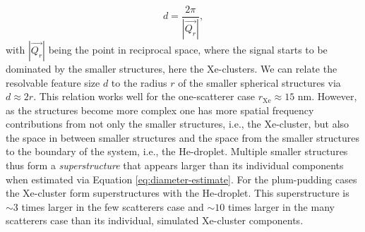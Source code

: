\begin{equation}
d = \frac{2\pi}{\left|\vec{Q_{r}}\right|},
\label{eq:diameter-estimate}
\end{equation}
with $\left|\vec{Q_{r}}\right|$ being the point in reciprocal space, where the signal starts to be dominated by the smaller structures, here the Xe-clusters. We can relate the resolvable feature size $d$ to the radius $r$ of the smaller spherical structures via $d\approx 2 r$. This relation works well for the one-scatterer case $r_{\text{Xe}}\approx 15$ nm. However, as the structures become more complex one has more spatial frequency contributions from not only the smaller structures, i.e., the Xe-cluster, but also the space in between smaller structures and the space from the smaller structures to the boundary of the system, i.e., the He-droplet. Multiple smaller structures thus form a \textit{superstructure} that appears larger than its individual components when estimated via Equation \eqref{eq:diameter-estimate}. For the plum-pudding cases the Xe-cluster form superstructures with the He-droplet. This superstructure is $\sim 3$ times larger in the few scatterers case and $\sim 10$ times larger in the many scatterers case than its individual, simulated Xe-cluster components.\\
